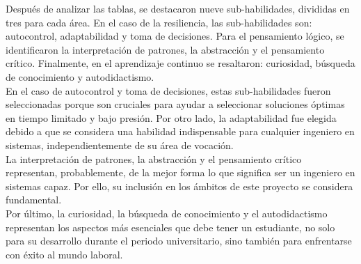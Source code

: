Después de analizar las tablas, se destacaron nueve sub-habilidades, divididas en tres para cada área. En el caso de la resiliencia, las sub-habilidades son: autocontrol, adaptabilidad y toma de decisiones. Para el pensamiento lógico, se identificaron la interpretación de patrones, la abstracción y el pensamiento crítico. Finalmente, en el aprendizaje continuo se resaltaron: curiosidad, búsqueda de conocimiento y autodidactismo.
\\
En el caso de autocontrol y toma de decisiones, estas sub-habilidades fueron seleccionadas porque son cruciales para ayudar a seleccionar soluciones óptimas en tiempo limitado y bajo presión. Por otro lado, la adaptabilidad fue elegida debido a que se considera una habilidad indispensable para cualquier ingeniero en sistemas, independientemente de su área de vocación.
\\
La interpretación de patrones, la abstracción y el pensamiento crítico representan, probablemente, de la mejor forma lo que significa ser un ingeniero en sistemas capaz. Por ello, su inclusión en los ámbitos de este proyecto se considera fundamental.
\\
Por último, la curiosidad, la búsqueda de conocimiento y el autodidactismo representan los aspectos más esenciales que debe tener un estudiante, no solo para su desarrollo durante el periodo universitario, sino también para enfrentarse con éxito al mundo laboral.






